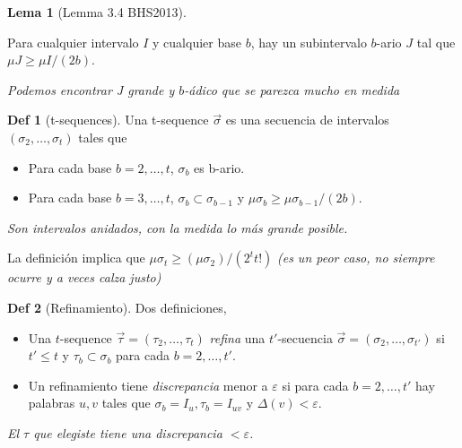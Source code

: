 \documentclass{article}
\theoremstyle{definition} %
\newtheorem{lemma}{Lema}
\newtheorem*{definition*}{Def}
\newcommand{\sigmatsequence}{\overset{\rightarrow}{\sigma}}
\begin{document}
\begin{lemma}[Lemma 3.4 BHS2013]\label{lemma:bhs-subinterval}

    Para cualquier intervalo $I$ y cualquier base $b$, hay un subintervalo
    $b$-ario $J$ tal que $\mu J \geq \mu I / (2b)$.

    \textit{Podemos encontrar J grande y $b$-ádico que se parezca mucho en medida}
\end{lemma}

\begin{definition*}[t-sequences]
    Una t-sequence $\sigmatsequence$ es una secuencia de intervalos $(\sigma_2,
    \dots, \sigma_t)$ tales que

    \begin{itemize}
        \item Para cada base $b = 2, \dots, t$, $\sigma_b$ es b-ario.
        \item Para cada base $b = 3, \dots, t$, $\sigma_b \subset \sigma_{b-1}$
        y $\mu \sigma_b \geq \mu \sigma_{b-1} / (2b)$.
    \end{itemize}

    \textit{Son intervalos anidados, con la medida lo más grande posible.}

    La definición implica que $\mu \sigma_t \geq (\mu \sigma_2)/(2^t t!)$
    \textit{(es un peor caso, no siempre ocurre y a veces calza justo)}

\end{definition*}

\begin{definition*}[Refinamiento]
    Dos definiciones,

    \begin{itemize}
        \item Una $t$-sequence $\overset{\rightarrow}{\tau} = (\tau_2, \dots,
        \tau_t)$ \textit{refina} una $t'$-secuencia $\sigmatsequence = (\sigma_2,
        \dots, \sigma_{t'})$ si $t' \leq t$ y $\tau_b \subset \sigma_b$ para cada
        $b = 2, \dots, t'$.

        \item Un refinamiento tiene \textit{discrepancia} menor a $\varepsilon$
        si para cada $b = 2, \dots, t'$ hay palabras $u, v$ tales que $\sigma_b
        = I_u, \tau_b = I_{uv}$ y $\Delta(v) < \varepsilon$.
    \end{itemize}
    

    \textit{El $\tau$ que elegiste tiene una discrepancia $< \varepsilon$.}
\end{definition*}
\end{document}

